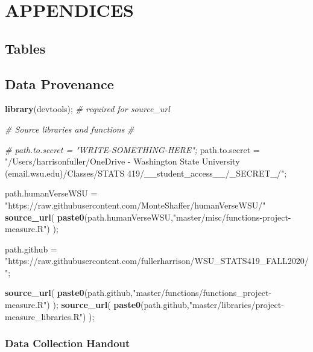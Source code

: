 \documentclass[]{article}
\newenvironment{Shaded}{\begin{snugshade}}{\end{snugshade}}
\newcommand{\CommentTok}[1]{\textcolor[rgb]{0.56,0.35,0.01}{\textit{#1}}}
\newcommand{\KeywordTok}[1]{\textcolor[rgb]{0.13,0.29,0.53}{\textbf{#1}}}
\newcommand{\NormalTok}[1]{#1}
\newcommand{\StringTok}[1]{\textcolor[rgb]{0.31,0.60,0.02}{#1}}
\begin{document}
\section{APPENDICES}
\label{sec:appendix}

\subsection{Tables}
\label{sec:appendix-table}





\newpage
\subsection{Data Provenance}
\label{sec:appendix-data-provenance}

\begin{Shaded}
\begin{Highlighting}[]
\KeywordTok{library}\NormalTok{(devtools);       }\CommentTok{# required for source_url}

\CommentTok{# Source libraries and functions}
\CommentTok{# }

\CommentTok{# path.to.secret = "WRITE-SOMETHING-HERE";}
\NormalTok{path.to.secret =}\StringTok{ "/Users/harrisonfuller/OneDrive - Washington State University (email.wsu.edu)/Classes/STATS 419/__student_access__/_SECRET_/"}\NormalTok{;}

\NormalTok{path.humanVerseWSU =}\StringTok{ "https://raw.githubusercontent.com/MonteShaffer/humanVerseWSU/"}
\KeywordTok{source_url}\NormalTok{( }\KeywordTok{paste0}\NormalTok{(path.humanVerseWSU,}\StringTok{"master/misc/functions-project-measure.R"}\NormalTok{) );}


\NormalTok{path.github =}\StringTok{ "https://raw.githubusercontent.com/fullerharrison/WSU_STATS419_FALL2020/"}\NormalTok{;}


\KeywordTok{source_url}\NormalTok{( }\KeywordTok{paste0}\NormalTok{(path.github,}\StringTok{"master/functions/functions_project-measure.R"}\NormalTok{) );}
\KeywordTok{source_url}\NormalTok{( }\KeywordTok{paste0}\NormalTok{(path.github,}\StringTok{"master/libraries/project-measure_libraries.R"}\NormalTok{) );}
\end{Highlighting}
\end{Shaded}

\newpage

\subsubsection{Data Collection Handout}
\label{sec:appendix-data-handout}
\end{document}
